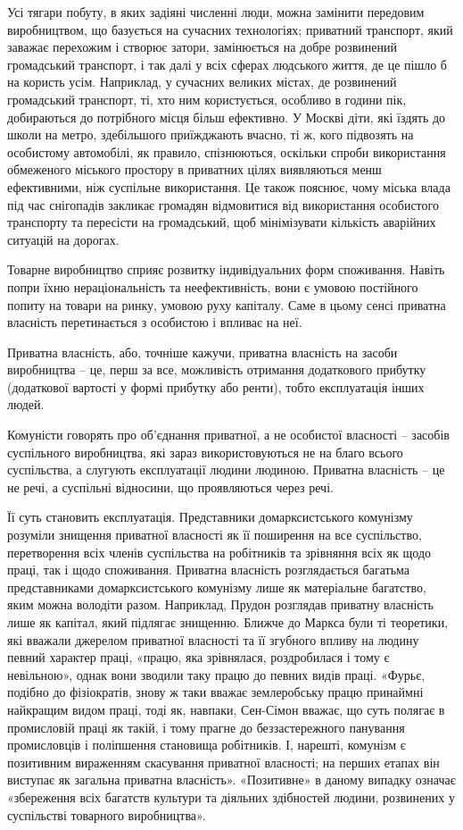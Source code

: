 \documentclass[12pt,a4paper,openany]{book}
\begin{document}
Усі тягари побуту, в яких задіяні численні люди, можна замінити передовим виробництвом, що базується на сучасних технологіях; приватний транспорт, який заважає перехожим і створює затори, замінюється на добре розвинений громадський транспорт, і так далі у всіх сферах людського життя, де це пішло б на користь усім. Наприклад, у сучасних великих містах, де розвинений громадський транспорт, ті, хто ним користується, особливо в години пік, добираються до потрібного місця більш ефективно. У Москві діти, які їздять до школи на метро, здебільшого приїжджають вчасно, ті ж, кого підвозять на особистому автомобілі, як правило, спізнюються, оскільки спроби використання обмеженого міського простору в приватних цілях виявляються менш ефективними, ніж суспільне використання. Це також пояснює, чому міська влада під час снігопадів закликає громадян відмовитися від використання особистого транспорту та пересісти на громадський, щоб мінімізувати кількість аварійних ситуацій на дорогах.

Товарне виробництво сприяє розвитку індивідуальних форм споживання. Навіть попри їхню нераціональність та неефективність, вони є умовою постійного попиту на товари на ринку, умовою руху капіталу. Саме в цьому сенсі приватна власність перетинається з особистою і впливає на неї.

Приватна власність, або, точніше кажучи, приватна власність на засоби виробництва – це, перш за все, можливість отримання додаткового прибутку (додаткової вартості у формі прибутку або ренти), тобто експлуатація інших людей.

Комуністи говорять про об’єднання приватної, а не особистої власності – засобів суспільного виробництва, які зараз використовуються не на благо всього суспільства, а слугують експлуатації людини людиною. Приватна власність – це не речі, а суспільні відносини, що проявляються через речі.

Її суть становить експлуатація. Представники домарксистського комунізму розуміли знищення приватної власності як її поширення на все суспільство, перетворення всіх членів суспільства на робітників та зрівняння всіх як щодо праці, так і щодо споживання. Приватна власність розглядається багатьма представниками домарксистського комунізму лише як матеріальне багатство, яким можна володіти разом. Наприклад, Прудон розглядав приватну власність лише як капітал, який підлягає знищенню. Ближче до Маркса були ті теоретики, які вважали джерелом приватної власності та її згубного впливу на людину певний характер праці, «працю, яка зрівнялася, роздробилася і тому є невільною», однак вони зводили таку працю до певних видів праці. «Фурьє, подібно до фізіократів, знову ж таки вважає землеробську працю принаймні найкращим видом праці, тоді як, навпаки, Сен-Сімон вважає, що суть полягає в промисловій праці як такій, і тому прагне до беззастережного панування промисловців і поліпшення становища робітників. І, нарешті, комунізм є позитивним вираженням скасування приватної власності; на перших етапах він виступає як загальна приватна власність». «Позитивне» в даному випадку означає «збереження всіх багатств культури та діяльних здібностей людини, розвинених у суспільстві товарного виробництва».
\end{document}
